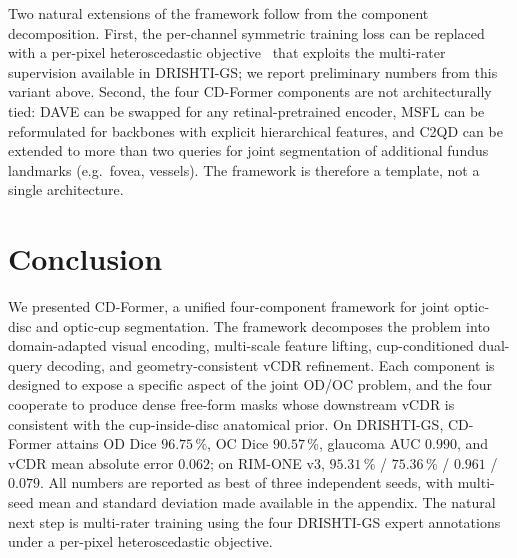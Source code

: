 \documentclass[10pt,journal,twocolumn]{IEEEtran}
\begin{document}
Two natural extensions of the framework follow from the component decomposition. First, the per-channel symmetric training loss can be replaced with a per-pixel heteroscedastic objective~\cite{kendall2017uncertainty} that exploits the multi-rater supervision available in DRISHTI-GS; we report preliminary numbers from this variant above. Second, the four CD-Former components are not architecturally tied: DAVE can be swapped for any retinal-pretrained encoder, MSFL can be reformulated for backbones with explicit hierarchical features, and C2QD can be extended to more than two queries for joint segmentation of additional fundus landmarks (e.g.\ fovea, vessels). The framework is therefore a template, not a single architecture.

\section{Conclusion}

We presented CD-Former, a unified four-component framework for joint optic-disc and optic-cup segmentation. The framework decomposes the problem into domain-adapted visual encoding, multi-scale feature lifting, cup-conditioned dual-query decoding, and geometry-consistent vCDR refinement. Each component is designed to expose a specific aspect of the joint OD/OC problem, and the four cooperate to produce dense free-form masks whose downstream vCDR is consistent with the cup-inside-disc anatomical prior. On DRISHTI-GS, CD-Former attains OD Dice $96.75\,\%$, OC Dice $90.57\,\%$, glaucoma AUC $0.990$, and vCDR mean absolute error $0.062$; on RIM-ONE v3, $95.31\,\%$ / $75.36\,\%$ / $0.961$ / $0.079$. All numbers are reported as best of three independent seeds, with multi-seed mean and standard deviation made available in the appendix. The natural next step is multi-rater training using the four DRISHTI-GS expert annotations under a per-pixel heteroscedastic objective.



\end{document}
